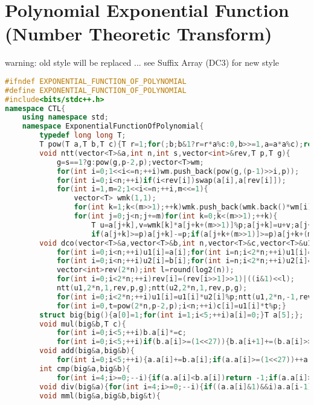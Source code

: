 \documentclass{book}
\begin{document}
\section{Polynomial Exponential Function (Number Theoretic Transform)}
warning: old style will be replaced ... see Suffix Array (DC3) for new style\begin{lstlisting}[language=C++,title={Polynomial Exponential Function (Number Theoretic Transform).hpp (5136 bytes, 80 lines)}]
#ifndef EXPONENTIAL_FUNCTION_OF_POLYNOMIAL
#define EXPONENTIAL_FUNCTION_OF_POLYNOMIAL
#include<bits/stdc++.h>
namespace CTL{
    using namespace std;
    namespace ExponentialFunctionOfPolynomial{
        typedef long long T;
        T pow(T a,T b,T c){T r=1;for(;b;b&1?r=r*a%c:0,b>>=1,a=a*a%c);return r;}
        void ntt(vector<T>&a,int n,int s,vector<int>&rev,T p,T g){
            g=s==1?g:pow(g,p-2,p);vector<T>wm;
            for(int i=0;1<<i<=n;++i)wm.push_back(pow(g,(p-1)>>i,p));
            for(int i=0;i<n;++i)if(i<rev[i])swap(a[i],a[rev[i]]);
            for(int i=1,m=2;1<<i<=n;++i,m<<=1){
                vector<T> wmk(1,1);
                for(int k=1;k<(m>>1);++k)wmk.push_back(wmk.back()*wm[i]%p);
                for(int j=0;j<n;j+=m)for(int k=0;k<(m>>1);++k){
                    T u=a[j+k],v=wmk[k]*a[j+k+(m>>1)]%p;a[j+k]=u+v;a[j+k+(m>>1)]=u-v+p;
                    if(a[j+k]>=p)a[j+k]-=p;if(a[j+k+(m>>1)]>=p)a[j+k+(m>>1)]-=p;}}}
        void dco(vector<T>&a,vector<T>&b,int n,vector<T>&c,vector<T>&u1,vector<T>&u2,T p,T g){
            for(int i=0;i<n;++i)u1[i]=a[i];for(int i=n;i<2*n;++i)u1[i]=0;
            for(int i=0;i<n;++i)u2[i]=b[i];for(int i=n;i<2*n;++i)u2[i]=0;
            vector<int>rev(2*n);int l=round(log2(n));
            for(int i=0;i<2*n;++i)rev[i]=(rev[i>>1]>>1)|((i&1)<<l);
            ntt(u1,2*n,1,rev,p,g);ntt(u2,2*n,1,rev,p,g);
            for(int i=0;i<2*n;++i)u1[i]=u1[i]*u2[i]%p;ntt(u1,2*n,-1,rev,p,g);
            for(int i=0,t=pow(2*n,p-2,p);i<n;++i)c[i]=u1[i]*t%p;}
        struct big{big(){a[0]=1;for(int i=1;i<5;++i)a[i]=0;}T a[5];};
        void mul(big&b,T c){
            for(int i=0;i<5;++i)b.a[i]*=c;
            for(int i=0;i<5;++i)if(b.a[i]>=(1<<27)){b.a[i+1]+=(b.a[i]>>27);b.a[i]&=((1<<27)-1);}}
        void add(big&a,big&b){
            for(int i=0;i<5;++i){a.a[i]+=b.a[i];if(a.a[i]>=(1<<27))++a.a[i+1],a.a[i]&=((1<<27)-1);}}
        int cmp(big&a,big&b){
            for(int i=4;i>=0;--i){if(a.a[i]<b.a[i])return -1;if(a.a[i]>b.a[i])return 1;}return 0;}
        void div(big&a){for(int i=4;i>=0;--i){if((a.a[i]&1)&&i)a.a[i-1]+=(1<<27);a.a[i]>>=1;}}
        void mml(big&a,big&b,big&t){

\end{lstlisting}
\end{document}
